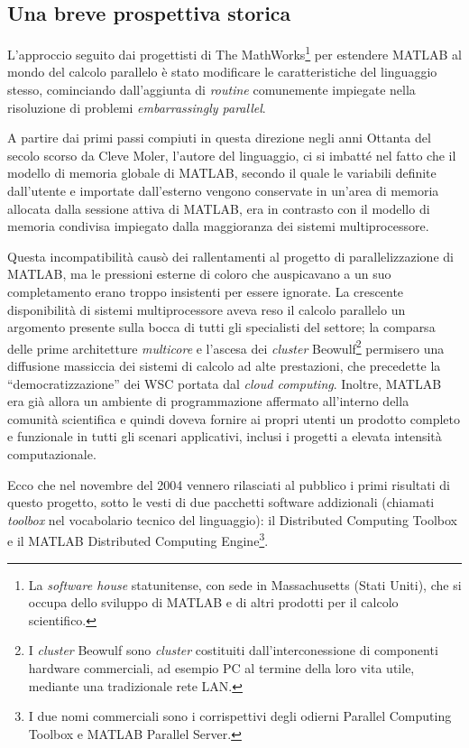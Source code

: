 \nocite{Sharma2009}
\subsection{Una breve prospettiva storica}
L'approccio seguito dai progettisti di The MathWorks\footnote{La \textit{software house} statunitense, con sede in Massachusetts (Stati Uniti), che si occupa dello sviluppo di MATLAB e di altri prodotti per il calcolo scientifico.}
per estendere MATLAB  al mondo del calcolo parallelo \`e stato modificare le caratteristiche del linguaggio 
stesso, cominciando dall'aggiunta di \textit{routine} comunemente impiegate nella risoluzione di problemi \textit{embarrassingly parallel}. 

A partire dai primi passi compiuti in questa direzione negli anni Ottanta del secolo scorso da Cleve Moler, l'autore del linguaggio, ci si imbatt\'e
nel fatto che il modello di memoria globale di MATLAB, secondo il quale le variabili definite dall'utente e importate dall'esterno vengono conservate 
in un'area di memoria allocata dalla sessione attiva di MATLAB, era in contrasto con il modello di memoria condivisa impiegato dalla maggioranza dei sistemi 
multiprocessore.

Questa incompatibilit\`a causò dei rallentamenti al progetto di parallelizzazione di MATLAB, ma le pressioni esterne di coloro che auspicavano a un suo completamento erano troppo insistenti per essere ignorate.\newline
La crescente disponibilit\`a di sistemi multiprocessore aveva reso il calcolo parallelo un argomento presente sulla bocca di tutti gli specialisti del 
settore; la comparsa delle prime architetture \textit{multicore} e l'ascesa dei \textit{cluster} Beowulf\footnote{I \textit{cluster} Beowulf sono \textit{cluster} costituiti dall'interconessione di componenti hardware commerciali, ad esempio PC al termine della loro vita utile, mediante una tradizionale rete LAN. } permisero una diffusione massiccia dei sistemi di calcolo ad alte prestazioni, che precedette la \enquote{democratizzazione} dei WSC portata dal \textit{cloud computing}.\newline   
Inoltre, MATLAB era gi\`a allora un ambiente di programmazione affermato all'interno della comunit\`a scientifica e quindi doveva fornire ai propri utenti un prodotto completo e funzionale 
in tutti gli scenari applicativi, inclusi i progetti a elevata intensit\`a computazionale.

Ecco che nel novembre del 2004 vennero rilasciati al pubblico i primi risultati di questo progetto, sotto le vesti di due pacchetti software addizionali (chiamati \textit{toolbox} nel vocabolario tecnico del linguaggio): il Distributed Computing 
Toolbox\textsuperscript{\texttrademark} e il MATLAB Distributed Computing Engine\textsuperscript{\texttrademark}\footnote{I due nomi commerciali sono i corrispettivi degli odierni Parallel 
Computing Toolbox\textsuperscript{\texttrademark} e MATLAB Parallel Server\textsuperscript{\texttrademark}.}.

